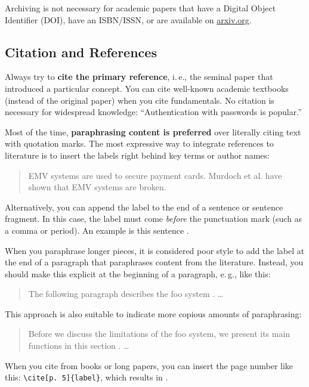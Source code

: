 Archiving is not necessary for academic papers that have a Digital Object Identifier (DOI), have an ISBN/ISSN, or are available on \url{arxiv.org}.


\subsection{Citation and References}

Always try to \textbf{cite the primary reference},%
i.\,e., the seminal paper that introduced a particular concept. You can cite well-known academic textbooks (instead of the original paper) when you cite fundamentals. No citation is necessary for widespread knowledge: ``Authentication with passwords is popular.''

Most of the time, \textbf{paraphrasing content is preferred} over literally citing text with quotation marks. The most expressive way to integrate references to literature is to insert the labels right behind key terms or author names:
\begin{quote}
  EMV systems \cite{anderson_ross_emv:_2014} are used to secure payment cards. Murdoch et al. \cite{murdoch_steven_j._chip_2010} have shown that EMV systems are broken.
\end{quote}

Alternatively, you can append the label to the end of a sentence or sentence fragment. In this case, the label must come \emph{before} the punctuation mark (such as a comma or period). An example is this sentence \cite{Hintz02}.

When you paraphrase longer pieces, it is considered poor style to add the label at the end of a paragraph that paraphrases content from the literature. Instead, you should make this explicit at the beginning of a paragraph, e.\,g., like this:
\begin{quote}
  The following paragraph describes the foo system \cite{kou_weidong_secure_2003}. …
\end{quote}

This approach is also suitable to indicate more copious amounts of paraphrasing:
\begin{quote}
  Before we discuss the limitations of the foo system, we present its main functions in this section \cite{kou_weidong_secure_2003}. …
\end{quote}

When you cite from books or long papers, you can insert the page number like this: \verb|\cite[p. 5]{label}|, which results in \cite[p. 5]{kou_weidong_secure_2003}.

